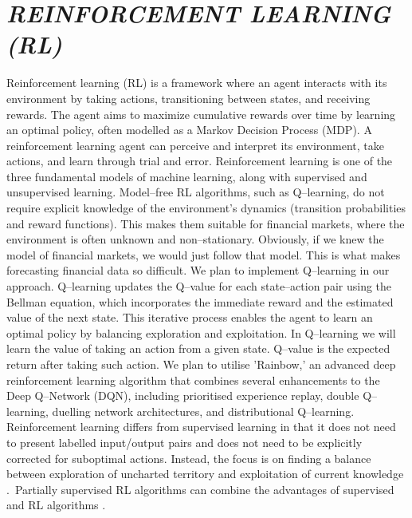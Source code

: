 \documentclass[12pt,a4paper]{report}
\numberwithin{equation}{section}
\begin{document}
\hypertarget{reinforcement--learning--rl}{%
\section{\texorpdfstring{\emph{\textbf{REINFORCEMENT LEARNING
(RL)}}}{REINFORCEMENT LEARNING (RL)}}\label{reinforcement--learning--rl}}

Reinforcement learning (RL) is a framework where an agent interacts with
its environment by taking actions, transitioning between states, and
receiving rewards. The agent aims to maximize cumulative rewards over
time by learning an optimal policy, often modelled as a Markov Decision
Process (MDP). A reinforcement learning agent can perceive and interpret
its environment, take actions, and learn through trial and error.
Reinforcement learning is one of the three fundamental models of machine
learning, along with supervised and unsupervised learning. Model--free RL
algorithms, such as Q--learning, do not require explicit knowledge of the
environment's dynamics (transition probabilities and reward functions).
This makes them suitable for financial markets, where the environment is
often unknown and non--stationary. Obviously, if we knew the model of
financial markets, we would just follow that model. This is what makes
forecasting financial data so difficult. We plan to implement Q--learning
in our approach. Q--learning updates the Q--value for each state--action
pair using the Bellman equation, which incorporates the immediate reward
and the estimated value of the next state. This iterative process
enables the agent to learn an optimal policy by balancing exploration
and exploitation. In Q--learning we will learn the value of taking an
action from a given state. Q--value is the expected return after taking
such action. We plan to utilise 'Rainbow,' an advanced deep
reinforcement learning algorithm that combines several enhancements to
the Deep Q--Network (DQN), including prioritised experience replay,
double Q--learning, duelling network architectures, and distributional
Q--learning. Reinforcement learning differs from supervised learning in
that it does not need to present labelled input/output pairs and does
not need to be explicitly corrected for suboptimal actions. Instead, the
focus is on finding a balance between exploration of uncharted territory
and exploitation of current knowledge \cite{moore1996reinforcement_52}.~Partially supervised RL
algorithms can combine the advantages of supervised and RL algorithms
\cite{pandian2018control_53}.
\end{document}
